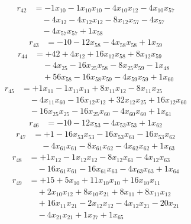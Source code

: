 \[\begin{aligned}
r_{42} &= - 1 x_{10} - 1 x_{10} x_{10} - 4 x_{10} x_{12} - 4 x_{10} x_{57} \\
 &\quad - 4 x_{12} - 4 x_{12} x_{12} - 8 x_{12} x_{57} - 4 x_{57} \\
 &\quad - 4 x_{57} x_{57} + 1 x_{58}
\end{aligned}\]
\[\begin{aligned}
r_{43} &= - 10 - 12 x_{58} - 4 x_{58} x_{58} + 1 x_{59}
\end{aligned}\]
\[\begin{aligned}
r_{44} &= + 42 + 4 x_{12} + 16 x_{12} x_{58} + 8 x_{12} x_{59} \\
 &\quad - 4 x_{25} - 16 x_{25} x_{58} - 8 x_{25} x_{59} - 1 x_{48} \\
 &\quad + 56 x_{58} - 16 x_{58} x_{59} - 4 x_{59} x_{59} + 1 x_{60}
\end{aligned}\]
\[\begin{aligned}
r_{45} &= + 1 x_{11} - 1 x_{11} x_{11} + 8 x_{11} x_{12} - 8 x_{11} x_{25} \\
 &\quad - 4 x_{11} x_{60} - 16 x_{12} x_{12} + 32 x_{12} x_{25} + 16 x_{12} x_{60} \\
 &\quad - 16 x_{25} x_{25} - 16 x_{25} x_{60} - 4 x_{60} x_{60} + 1 x_{61}
\end{aligned}\]
\[\begin{aligned}
r_{46} &= - 10 - 12 x_{53} - 4 x_{53} x_{53} + 1 x_{62}
\end{aligned}\]
\[\begin{aligned}
r_{47} &= + 1 - 16 x_{53} x_{53} - 16 x_{53} x_{61} - 16 x_{53} x_{62} \\
 &\quad - 4 x_{61} x_{61} - 8 x_{61} x_{62} - 4 x_{62} x_{62} + 1 x_{63}
\end{aligned}\]
\[\begin{aligned}
r_{48} &= + 1 x_{12} - 1 x_{12} x_{12} - 8 x_{12} x_{61} - 4 x_{12} x_{63} \\
 &\quad - 16 x_{61} x_{61} - 16 x_{61} x_{63} - 4 x_{63} x_{63} + 1 x_{64}
\end{aligned}\]
\[\begin{aligned}
r_{49} &= + 15 + 5 x_{10} + 11 x_{10} x_{10} + 16 x_{10} x_{11} \\
 &\quad + 2 x_{10} x_{12} + 8 x_{10} x_{21} + 8 x_{11} + 8 x_{11} x_{12} \\
 &\quad + 16 x_{11} x_{21} - 2 x_{12} x_{12} - 4 x_{12} x_{21} - 20 x_{21} \\
 &\quad - 4 x_{21} x_{21} + 1 x_{27} + 1 x_{65}
\end{aligned}\]

